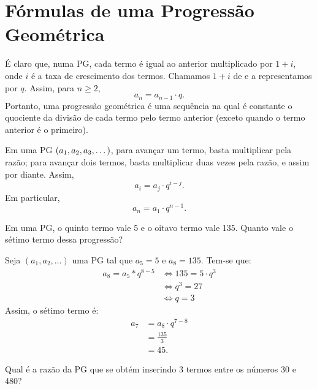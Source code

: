 \section{Fórmulas de uma Progressão Geométrica}

\begin{remark}
É claro que, numa PG, cada termo é igual ao anterior multiplicado por $1 + i$, onde $i$ é a taxa de crescimento dos termos. Chamamos $1+i$ de  e a representamos por $q$. Assim, para $n \ge 2$,
%
\begin{equation*}
a_n = a_{n-1} \cdot q.
\end{equation*}
%
\noindent Portanto, uma progressão geométrica é uma sequência na qual é constante o quociente da divisão de cada termo pelo termo anterior (exceto quando o termo anterior é o primeiro). 

Em uma PG $\left(a_1, a_2, a_3 , \dots\right)$, para avançar um termo, basta multiplicar pela razão; para avançar dois termos, basta multiplicar duas vezes pela razão, e assim por diante. Assim, 
%
\begin{equation*}
a_i = a_j \cdot q^{i-j}.
\end{equation*}
%
Em particular,
%
\begin{equation*}
a_n = a_1\cdot q^{n-1}.
\end{equation*}
\end{remark}

\begin{example}
Em uma PG, o quinto termo vale 5 e o oitavo termo vale 135. Quanto vale o sétimo termo dessa progressão?
\end{example}

\begin{solution}
Seja $(a_1, a_2, \dots)$ uma PG tal que $a_5 =5$ e $a_8=135$. Tem-se que:
%
\begin{align*}
a_8 = a_5 * q^{8-5} & \iff 135 = 5 \cdot q ^3 \\ & \iff q^3 = 27 \\ & \iff q = 3
\end{align*}
%
Assim, o sétimo termo é:
%
\begin{align*}
a_7 & = a_8 \cdot q ^{7-8} \\ &= \frac {135} 3 \\ &= 45.
\end{align*}
\end{solution}

\begin{example}
Qual é a razão da PG que se obtém inserindo 3 termos entre os números 30 e 480?
\end{example}

